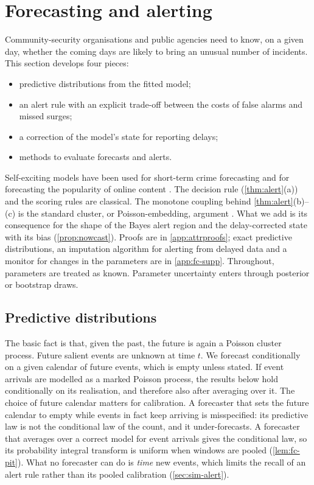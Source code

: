 \section{Forecasting and alerting}\label{sec:forecasting}

Community-security organisations and public agencies need to know, on a given day,
whether the coming days are likely to bring an unusual number of incidents. This
section develops four pieces:
\begin{itemize}
  \item predictive distributions from the fitted model;
  \item an alert rule with an explicit trade-off between the costs of false alarms and
  missed surges;
  \item a correction of the model's state for reporting delays;
  \item methods to evaluate forecasts and alerts.
\end{itemize}
Self-exciting models have been used for short-term crime forecasting
\citep{mohler2011,reinhart2018} and for forecasting the popularity of online content
\citep{zhao2015,rizoiu2017}. The decision rule (\cref{thm:alert}(a)) and the scoring
rules are classical. The monotone coupling behind \cref{thm:alert}(b)--(c) is the
standard cluster, or Poisson-embedding, argument \citep{hawkes1974,bremaud1996}. What we
add is its consequence for the shape of the Bayes alert region and the delay-corrected
state with its bias (\cref{prop:nowcast}). Proofs are in \cref{app:attrproofs}; exact
predictive distributions, an imputation algorithm for alerting from delayed data and a
monitor for changes in the parameters are in \cref{app:fc-supp}. Throughout, parameters
are treated as known. Parameter uncertainty enters through posterior or bootstrap draws.

\subsection{Predictive distributions}\label{sec:fc-predictive}

The basic fact is that, given the past, the future is again a Poisson cluster process.
Future salient events are unknown at time $t$. We forecast conditionally on a given
calendar of future events, which is empty unless stated. If event arrivals are modelled
as a marked Poisson process, the results below hold conditionally on its realisation,
and therefore also after averaging over it.
The choice of future calendar matters for calibration. A forecaster that sets the
future calendar to empty while events in fact keep arriving is misspecified: its
predictive law is not the conditional law of the count, and it under-forecasts. A
forecaster that averages over a correct model for event arrivals gives the conditional
law, so its probability integral transform is uniform when windows are pooled
(\cref{lem:fc-pit}). What no forecaster can do is \emph{time} new events, which limits
the recall of an alert rule rather than its pooled calibration (\cref{sec:sim-alert}).

